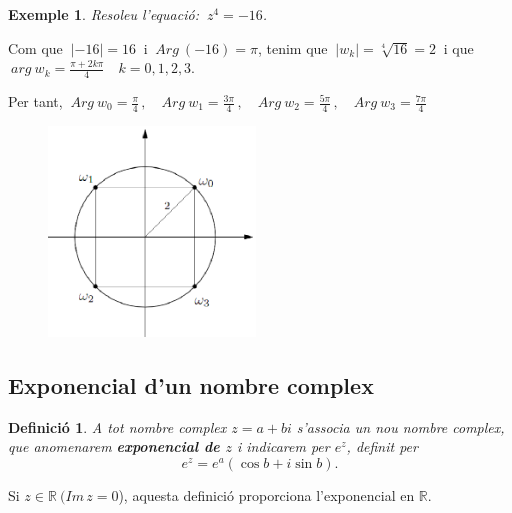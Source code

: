 \documentclass[12pt]{article}
\newtheorem{definicio}{Definici{\'o}}[subsection]
\newtheorem{exemple}{Exemple}[subsection]
\newcommand{\R}{\mathbb{R}}
\begin{document}
\vspace{0.4cm}
\begin{exemple}
 Resoleu l'equaci{\'o}: $\ z^4=-16$.
\end{exemple}

Com que $\ |-16|=16\ $ i $\ Arg\ (-16)=\pi$,
tenim que $\ |w_k|=\sqrt[4]{16}=2\ $ i que  $\ arg\
w_k=\frac{\pi+2k\pi}{4}\quad k=0,1,2,3.$

 Per tant, $\displaystyle\  Arg\ w_0=\frac{\pi}{4}\,,\quad Arg\ w_1=\frac{3\pi}{4}\,,\quad Arg\ w_2=\frac{5\pi}{4}\,,\quad Arg\ w_3=\frac{7\pi}{4}$


\begin{figure}[h!]
\begin{center}
\includegraphics[width=5.5cm]{figura3.eps}
\vspace{-.4cm}
\end{center}
\end{figure}

\subsection{Exponencial d'un nombre complex}\label{exponencial}

\begin{definicio}
A tot nombre complex $z=a+bi$ s'associa un nou  nombre complex,
que anomenarem \textbf{exponencial de $z$} i indicarem per $e^z$,
definit per $$ e^z = e^a  (\cos b + i \sin b). $$
\end{definicio}

\vspace{0.4cm}\begin{observacio}
Si $z\in\R\ (Im\,  z=0$), aquesta definici{\'o} proporciona l'exponencial en $\R$.
\end{observacio}
\end{document}
